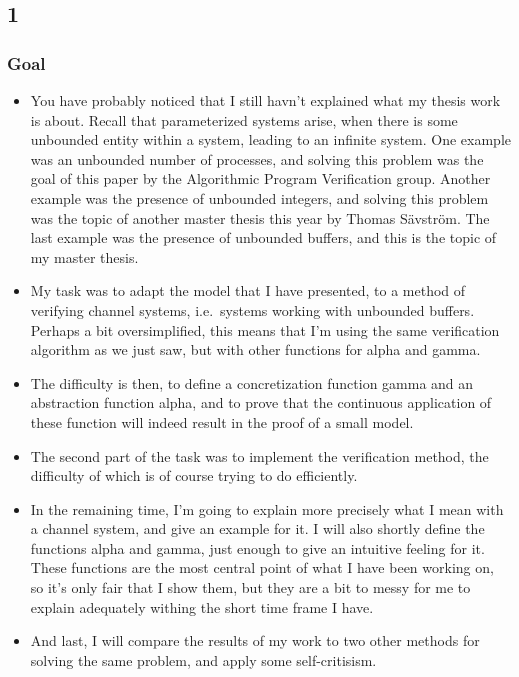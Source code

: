 \documentclass[handout]{beamer}
\begin{document}
\begin{footnotesize}
\subsection*{1}
\begin{frame}
  \frametitle{Goal}
  \begin{itemize}
    \item
You have probably noticed that I still havn't explained what my thesis work is about. Recall that parameterized systems arise, when there is some unbounded entity within a system, leading to an infinite system. One example was an unbounded number of processes, and solving this problem was the goal of this paper by the Algorithmic Program Verification group. Another example was the presence of unbounded integers, and solving this problem was the topic of another master thesis this year by Thomas Sävström. The last example was the presence of unbounded buffers, and this is the topic of my master thesis.
\item
My task was to adapt the model that I have presented, to a method of verifying channel systems, i.e.\ systems working with unbounded buffers. Perhaps a bit oversimplified, this means that I'm using the same verification algorithm as we just saw, but with other functions for alpha and gamma.
\item
The difficulty is then, to define a concretization function gamma and an abstraction function alpha, and to prove that the continuous application of these function will indeed result in the proof of a small model.
\item
The second part of the task was to implement the verification method, the difficulty of which is of course trying to do efficiently.
  \end{itemize}
\end{frame}

\begin{frame}
\begin{itemize}
\item
In the remaining time, I'm going to explain more precisely what I mean with a channel system, and give an example for it. I will also shortly define the functions alpha and gamma, just enough to give an intuitive feeling for it. These functions are the most central point of what I have been working on, so it's only fair that I show them, but they are a bit to messy for me to explain adequately withing the short time frame I have.
\item
And last, I will compare the results of my work to two other methods for solving the same problem, and apply some self-critisism.
\end{itemize}
\end{frame}



\end{footnotesize}
\end{document}
